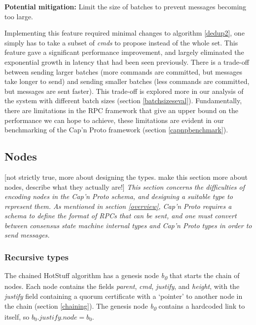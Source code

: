 \textbf{Potential mitigation: } Limit the size of batches to prevent messages becoming too large.

Implementing this feature required minimal changes to algorithm \ref{dedup2}, one simply has to take a subset of \textit{cmds} to propose instead of the whole set. This feature gave a significant performance improvement, and largely eliminated the exponential growth in latency that had been seen previously. There is a trade-off between sending larger batches (more commands are committed, but messages take longer to send) and sending smaller batches (less commands are committed, but messages are sent faster). This trade-off is explored more in our analysis of the system with different batch sizes (section \ref{batchsizeseval}). Fundamentally, there are limitations in the RPC framework that give an upper bound on the performance we can hope to achieve, these limitations are evident in our benchmarking of the Cap'n Proto framework (section \ref{capnpbenchmark}).

\subsection{Nodes}
[not strictly true, more about designing the types. make this section more about nodes, describe what they actually are!]
\textit{This section concerns the difficulties of encoding nodes in the Cap'n Proto schema, and designing a suitable type to represent them. As mentioned in section \ref{overview}, Cap'n Proto requires a schema to define the format of RPCs that can be sent, and one must convert between consensus state machine internal types and Cap'n Proto types in order to send messages.}

\subsubsection{Recursive types}
The chained HotStuff algorithm has a genesis node \textit{b\textsubscript{0}} that starts the chain of nodes. Each node contains the fields \textit{parent}, \textit{cmd}, \textit{justify}, and \textit{height}, with the \textit{justify} field containing a quorum certificate with a `pointer' to another node in the chain (section \ref{chaining}). The genesis node \textit{b\textsubscript{0}} contains a hardcoded link to itself, so $ b_0.\textit{justify}.\textit{node} = b_0$.

